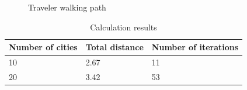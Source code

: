 \documentclass[12pt]{article}
\begin{document}
\begin{figure}[h]
    \centering
    \caption{Traveler walking path}
\end{figure}

\begin{table}[h]
    \centering
    \caption{Calculation results}
    \vspace{12pt}
    \begin{tabular}{lll}
    \hline
    Number of cities & Total distance & Number of iterations \\ \hline
    \hspace{2em}  10 &\hspace{2em}  2.67  & \hspace{3em}   11 \\
    \hspace{2em}   20 & \hspace{2em}   3.42  & \hspace{3em}   53 \\ \hline
    \end{tabular}
    \end{table}
\end{document}
